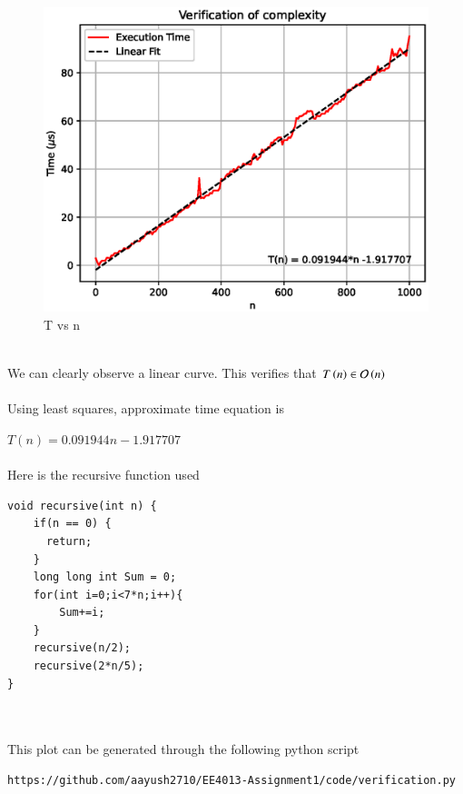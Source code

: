 \documentclass[journal,12pt,twocolumn]{IEEEtran}
\begin{document}
\begin{figure}[!h]
    \centering
    \includegraphics[scale=0.55]{figs/plot.eps}
    \caption{T vs n}
    \label{fig:verification}
\end{figure}
\\
We can clearly observe a linear curve. This verifies that 
$T\left(n\right) \in \mathcal{O}\left(n\right)$
\\
\\
Using least squares, approximate time equation is 

$T(n) = 0.091944n -1.917707$
\\
\\
Here is the recursive function used
\\
\begin{lstlisting}
void recursive(int n) {
    if(n == 0) {
      return;
    }
    long long int Sum = 0;
    for(int i=0;i<7*n;i++){ 
        Sum+=i;
    }
    recursive(n/2);
    recursive(2*n/5);
}
\end{lstlisting}
\\
\\
This plot can be generated through the following python script
\begin{lstlisting}
https://github.com/aayush2710/EE4013-Assignment1/code/verification.py
\end{lstlisting}
\end{document}
